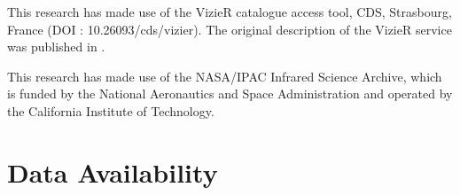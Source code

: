 \documentclass[letters,usenatbib,times]{mnras}
\begin{document}
This research has made use of the VizieR catalogue access tool, CDS, Strasbourg, France (DOI : 10.26093/cds/vizier). The original description of the VizieR service was published in \citet{2000A&AS..143...23O}.

This research has made use of the NASA/IPAC Infrared Science Archive, which is funded by the National Aeronautics and Space Administration and operated by the California Institute of Technology.

\section*{Data Availability}











\bsp	%
\label{lastpage}
\end{document}
